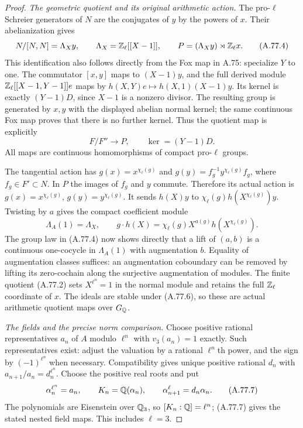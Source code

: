 \begin{proof}
\emph{The geometric quotient and its original arithmetic action.}
The pro-$\ell$ Schreier generators of $N$ are the conjugates of
$y$ by the powers of $x$.  Their abelianization gives
\[
 N/[N,N]=\Lambda_X y,\qquad
 \Lambda_X=\mathbb Z_\ell[[X-1]],\qquad
 P=(\Lambda_X y)\rtimes\mathbb Z_\ell x.
 \tag{A.77.4}
\]
This identification also follows directly from the Fox map in A.75:
specialize $Y$ to one.  The commutator $[x,y]$ maps to
$(X-1)y$, and the full derived module
$\mathbb Z_\ell[[X-1,Y-1]]e$ maps by
$h(X,Y)e\mapsto h(X,1)(X-1)y$.
Its kernel is exactly $(Y-1)D$, since $X-1$ is a nonzero divisor.
The resulting group is generated by $x,y$ with the displayed
abelian normal kernel; the same continuous Fox map proves that
there is no further kernel.  Thus the quotient map is explicitly
\[
 F/F''\longrightarrow P,
 \qquad \ker=(Y-1)D.
 \tag{A.77.5}
\]
All maps are continuous homomorphisms of compact pro-$\ell$ groups.

The tangential action has
$g(x)=x^{\chi_\ell(g)}$ and
$g(y)=f_g^{-1}y^{\chi_\ell(g)}f_g$, where $f_g\in F'\subset N$.
In $P$ the images of $f_g$ and $y$ commute.  Therefore its actual
action is
$g(x)=x^{\chi_\ell(g)}$, $g(y)=y^{\chi_\ell(g)}$.
It sends $h(X)y$ to
$\chi_\ell(g)h(X^{\chi_\ell(g)})y$.
Twisting by $a$ gives the compact coefficient module
\[
 \Lambda_A(1)=\Lambda_X,
 \qquad g\cdot h(X)=
  \chi_\ell(g)X^{a(g)}h(X^{\chi_\ell(g)}).
 \tag{A.77.6}
\]
The group law in (A.77.4) now shows directly that a lift of
$(a,b)$ is a continuous one-cocycle in $\Lambda_A(1)$ with
augmentation $b$.  Equality of augmentation classes suffices:
an augmentation coboundary can be removed by lifting its
zero-cochain along the surjective augmentation of modules.
The finite quotient (A.77.2) sets $X^{\ell^n}=1$ in the
normal module and retains the full $\mathbb Z_\ell$ coordinate of $x$.
The ideals are stable under (A.77.6), so these are actual
arithmetic quotient maps over $G_\mathbb Q$.

\emph{The fields and the precise norm comparison.}
Choose positive rational representatives $a_n$ of $A$ modulo
$\ell^n$ with $v_3(a_n)=1$ exactly.  Such representatives exist:
adjust the valuation by a rational $\ell^n$th power, and the
sign by $(-1)^{\ell^n}$ when necessary.
Compatibility gives unique positive rational $d_n$ with
$a_{n+1}/a_n=d_n^{\ell^n}$.
Choose the positive real roots and put
\[
 \alpha_n^{\ell^n}=a_n,\qquad
 K_n=\mathbb Q(\alpha_n),\qquad
 \alpha_{n+1}^{\ell}=d_n\alpha_n.
 \tag{A.77.7}
\]
The polynomials are Eisenstein over $\mathbb Q_3$, so
$[K_n:\mathbb Q]=\ell^n$; (A.77.7) gives the stated nested field maps.
This includes $\ell=3$.


\end{proof}
